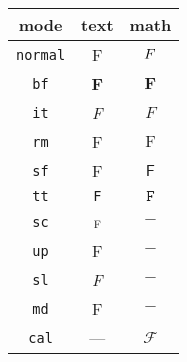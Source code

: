 \documentclass{unittest}
\begin{document}
\begin{tabular}{ccc}
\toprule
mode & text & math \\
\midrule
\verb|normal| & \textnormal{F}  & $\mathnormal{F}$ \\
\verb|bf|     & \textbf{F}      & $\mathbf{F}$     \\
\verb|it|     & \textit{F}      & $\mathit{F}$     \\
\verb|rm|     & \textrm{F}      & $\mathrm{F}$     \\
\verb|sf|     & \textsf{F}      & $\mathsf{F}$     \\
\verb|tt|     & \texttt{F}      & $\mathtt{F}$     \\
\verb|sc|     & \textsc{f}      & $-$              \\
\verb|up|     & \textup{F}      & $-$              \\
\verb|sl|     & \textsl{F}      & $-$              \\
\verb|md|     & \textmd{F}      & $-$              \\
\verb|cal|    & ---             & $\mathcal{F}$    \\
\bottomrule
\end{tabular}

\end{document}
